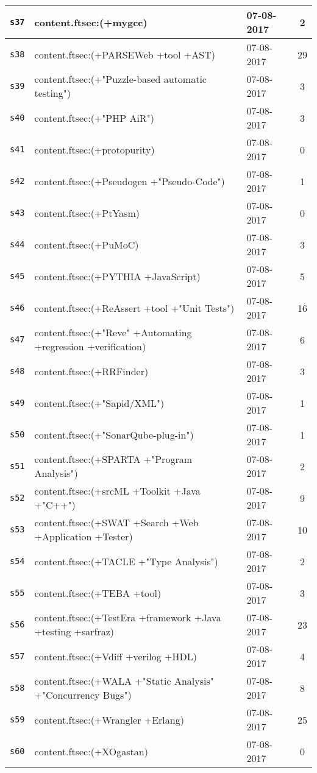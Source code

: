 \begin{longtable}{| l | p{13cm} | l | c |}
    \hline
\texttt{s37} & content.ftsec:(+mygcc) & 07-08-2017 & 2 \\
    \hline
\texttt{s38} & content.ftsec:(+PARSEWeb +tool +AST) & 07-08-2017 & 29 \\
    \hline
\texttt{s39} & content.ftsec:(+"Puzzle-based automatic testing") & 07-08-2017 & 3 \\
    \hline
\texttt{s40} & content.ftsec:(+"PHP AiR") & 07-08-2017 & 3 \\
    \hline
\texttt{s41} & content.ftsec:(+protopurity) & 07-08-2017 & 0 \\
    \hline
\texttt{s42} & content.ftsec:(+Pseudogen +"Pseudo-Code") & 07-08-2017 & 1 \\
    \hline
\texttt{s43} & content.ftsec:(+PtYasm) & 07-08-2017 & 0 \\
    \hline
\texttt{s44} & content.ftsec:(+PuMoC) & 07-08-2017 & 3 \\
    \hline
\texttt{s45} & content.ftsec:(+PYTHIA +JavaScript) & 07-08-2017 & 5 \\
    \hline
\texttt{s46} & content.ftsec:(+ReAssert +tool +"Unit Tests") & 07-08-2017 & 16 \\
    \hline
\texttt{s47} & content.ftsec:(+"Reve" +Automating +regression +verification) & 07-08-2017 & 6 \\
    \hline
\texttt{s48} & content.ftsec:(+RRFinder) & 07-08-2017 & 3 \\
    \hline
\texttt{s49} & content.ftsec:(+"Sapid/XML") & 07-08-2017 & 1 \\
    \hline
\texttt{s50} & content.ftsec:(+"SonarQube-plug-in") & 07-08-2017 & 1 \\
    \hline
\texttt{s51} & content.ftsec:(+SPARTA +"Program Analysis") & 07-08-2017 & 2 \\
    \hline
\texttt{s52} & content.ftsec:(+srcML +Toolkit +Java +"C++") & 07-08-2017 & 9 \\
    \hline
\texttt{s53} & content.ftsec:(+SWAT +Search +Web +Application +Tester) & 07-08-2017 & 10 \\
    \hline
\texttt{s54} & content.ftsec:(+TACLE +"Type Analysis") & 07-08-2017 & 2 \\
    \hline
\texttt{s55} & content.ftsec:(+TEBA +tool) & 07-08-2017 & 3 \\
    \hline
\texttt{s56} & content.ftsec:(+TestEra +framework +Java +testing +sarfraz) & 07-08-2017 & 23 \\
    \hline
\texttt{s57} & content.ftsec:(+Vdiff +verilog +HDL) & 07-08-2017 & 4 \\
    \hline
\texttt{s58} & content.ftsec:(+WALA +"Static Analysis" +"Concurrency Bugs") & 07-08-2017 & 8 \\
    \hline
\texttt{s59} & content.ftsec:(+Wrangler +Erlang) & 07-08-2017 & 25 \\
    \hline
\texttt{s60} & content.ftsec:(+XOgastan) & 07-08-2017 & 0 \\
    \hline
  \hline
\end{longtable}

